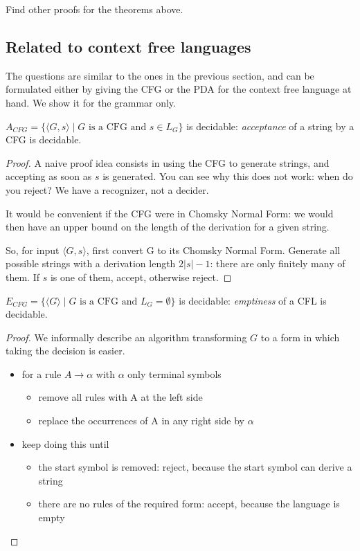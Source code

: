 \begin{exercise}
Find other proofs for the theorems above.
\end{exercise}


\subsection{Related to context free languages}

The questions are similar to the ones in the previous section, and can
be formulated either by giving the CFG or the PDA for the context free
language at hand. We show it for the grammar only.

\begin{theorem} \label{acfg}
$A_{CFG} = \{\langle G,s \rangle\mid \text{$G$ is a CFG and $s\in L_G$}\}$ is
    decidable: {\em acceptance} of a string by a CFG is decidable.
\end{theorem}
\begin{proof}
A naive proof idea consists in using the CFG to generate strings, and
accepting as soon as $s$ is generated. You can see why this does not work:
when do you reject? We have a recognizer, not a decider.

It would be convenient if the CFG were in Chomsky Normal Form: we
would then have an upper bound on the length of the derivation for a
given string.

So, for input $\langle G,s \rangle$, first convert G to its Chomsky
Normal Form. Generate all possible strings with a derivation length
$2|s|-1$: there are only finitely many of them. If $s$ is one of them,
accept, otherwise reject.
\end{proof}

\begin{theorem}
$E_{CFG} = \{\langle G \rangle\mid \text{$G$ is a CFG and $L_G = \emptyset$}\}$ is decidable: {\em emptiness} of a CFL is decidable.
\end{theorem}
\begin{proof}
We informally describe an algorithm transforming $G$ to a form in which
taking the decision is easier.
\begin{itemize}
\item
for a rule $A \rightarrow \alpha$ with $\alpha$ only terminal symbols
\begin{itemize}
\item remove all rules with A at the left side
\item replace the occurrences of A in any right side by $\alpha$
\end{itemize}


\item
keep doing this until
\begin{itemize}
\item the start symbol is removed: reject, because the start symbol
  can derive a string
\item there are no rules of the required form: accept, because the
  language is empty
\end{itemize}
\end{itemize}
\end{proof}

